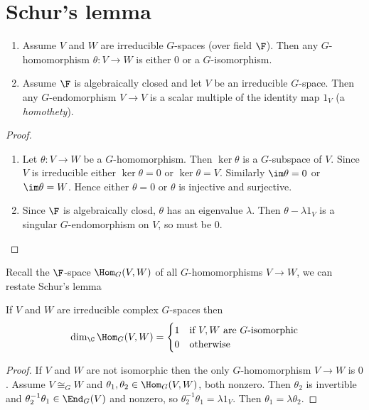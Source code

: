 \documentclass[a4paper]{article}
\theoremstyle{definition}
\begin{document}
\section{Schur's lemma}

\begin{theorem}\leavevmode
  \begin{enumerate}
  \item Assume \(V\) and \(W\) are irreducible \(G\)-spaces (over field \(\F\)). Then any \(G\)-homomorphism \(\theta: V \to W\) is either \(0\) or a \(G\)-isomorphism.
  \item Assume \(\F\) is algebraically closed and let \(V\) be an irreducible \(G\)-space. Then any \(G\)-endomorphism \(V \to V\) is a scalar multiple of the identity map \(1_V\) (a \emph{homothety}).
  \end{enumerate}
\end{theorem}

\begin{proof}\leavevmode
  \begin{enumerate}
  \item Let \(\theta: V \to W\) be a \(G\)-homomorphism. Then \(\ker \theta\) is a \(G\)-subspace of \(V\). Since \(V\) is irreducible either \(\ker \theta = 0\) or \(\ker \theta = V\). Similarly \(\im \theta = 0\) or \(\im \theta = W\). Hence either \(\theta = 0\) or \(\theta\) is injective and surjective.
  \item Since \(\F\) is algebraically closd, \(\theta\) has an eigenvalue \(\lambda\). Then \(\theta - \lambda 1_V\) is a singular \(G\)-endomorphism on \(V\), so must be \(0\).
  \end{enumerate}
\end{proof}

Recall the \(\F\)-space \(\Hom_G(V, W)\) of all \(G\)-homomorphisms \(V \to W\), we can restate Schur's lemma
\begin{corollary}
  If \(V\) and \(W\) are irreducible complex \(G\)-spaces then
  \[
    \dim_\C \Hom_G(V, W) =
    \begin{cases}
      1 & \text{if \(V, W\) are \(G\)-isomorphic} \\
      0 & \text{otherwise}
    \end{cases}
  \]
\end{corollary}

\begin{proof}
  If \(V\) and \(W\) are not isomorphic then the only \(G\)-homomorphism \(V \to W\) is \(0\). Assume \(V \cong_G W\) and \(\theta_1, \theta_2 \in \Hom_G(V, W)\), both nonzero. Then \(\theta_2\) is invertible and \(\theta_2^{-1}\theta_1 \in \End_G(V)\) and nonzero, so \(\theta_2^{-1}\theta_1 = \lambda 1_V\). Then \(\theta_1 = \lambda \theta_2\).
\end{proof}
\end{document}
